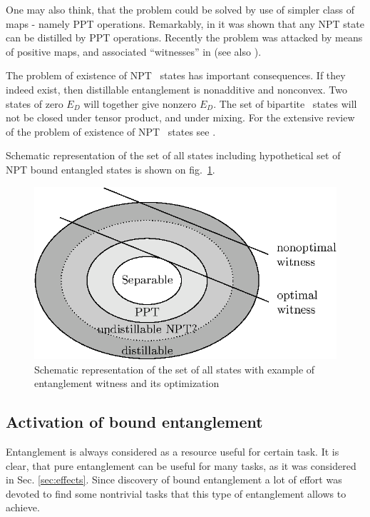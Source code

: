 \documentclass[rmp,12pt,preprint]{revtex4-2}
\begin{document}
One may also think, that the problem could be solved by use of simpler
class of maps - namely PPT operations. Remarkably, in \cite{WernerPPT}
it was shown that any NPT state can be distilled by PPT operations.
Recently the problem was attacked by means of positive maps, and
associated ``witnesses'' in \cite{Clarisse2004-distil-maps} (see also
\cite{Clarisse2005-distil}).

The problem of existence of NPT \bent\ states has important
consequences. If they indeed exist, then distillable entanglement is
nonadditive and nonconvex. Two states of zero $E_D$ will together give
nonzero $E_D$. The set of bipartite \bent\ states will not be closed
under tensor product, and under mixing. For the extensive review of
the problem of existence of NPT \bent\ states see \cite{ClarissePhd}.

Schematic representation of the set of all states including
hypothetical set of NPT bound entangled states is shown on
fig.~\ref{fig:states-and-witnesses}.

\begin{figure}
  \centering
  \includegraphics{fig-states-and-witnesses}
  \caption{Schematic representation of the set of all states with
    example of entanglement witness and its optimization}
  \label{fig:states-and-witnesses}
\end{figure}

\subsection{Activation of bound entanglement}
\label{subsec:activbound}
Entanglement is always considered as a resource useful for certain
task. It is clear, that pure entanglement can be useful for many
tasks, as it was considered in Sec. \ref{sec:effects}. Since
discovery of bound entanglement a lot of effort was devoted to find
some nontrivial tasks that this type of entanglement
allows to achieve.
\end{document}
